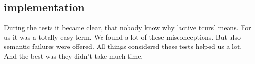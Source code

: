 \clearpage

\subsection{implementation}

During the tests it became clear, that nobody know why 'active tours' means. For us it was a totally easy term. We found a lot of
these misconceptions. But also semantic failures were offered. All things considered these tests helped us a lot. And the best was
they didn't take much time.


